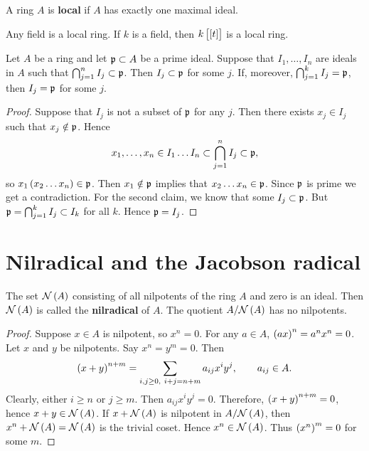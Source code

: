 \begin{definition}
A ring $ A $ is \textbf{local} if $ A $ has exactly one maximal ideal.
\end{definition}

\begin{example*}
Any field is a local ring. If $ k $ is a field, then $ k\sbr{\sbr{t}} $ is a local ring.
\end{example*}

\begin{lemma}
\label{lem:4.12}
Let $ A $ be a ring and let $ \mathfrak{p} \subset A $ be a prime ideal. Suppose that $ I_1, \dots, I_n $ are ideals in $ A $ such that $ \bigcap_{j = 1}^n I_j \subset \mathfrak{p} $. Then $ I_j \subset \mathfrak{p} $ for some $ j $. If, moreover, $ \bigcap_{j = 1}^k I_j = \mathfrak{p} $, then $ I_j = \mathfrak{p} $ for some $ j $.
\end{lemma}

\begin{proof}
Suppose that $ I_j $ is not a subset of $ \mathfrak{p} $ for any $ j $. Then there exists $ x_j \in I_j $ such that $ x_j \notin \mathfrak{p} $. Hence
$$ x_1, \dots, x_n \in I_1 \dots I_n \subset \bigcap_{j = 1}^n I_j \subset \mathfrak{p}, $$
so $ x_1\br{x_2 \dots x_n} \in \ppp $. Then $ x_1 \notin \mathfrak{p} $ implies that $ x_2 \dots x_n \in \mathfrak{p} $. Since $ \mathfrak{p} $ is prime we get a contradiction. For the second claim, we know that some $ I_j \subset \mathfrak{p} $. But $ \mathfrak{p} = \bigcap_{j = 1}^k I_j \subset I_k $ for all $ k $. Hence $ \mathfrak{p} = I_j $.
\end{proof}

\section{Nilradical and the Jacobson radical}


\begin{proposition}
The set $ \NNN\br{A} $ consisting of all nilpotents of the ring $ A $ and zero is an ideal. Then $ \NNN\br{A} $ is called the \textbf{nilradical} of $ A $. The quotient $ A / \NNN\br{A} $ has no nilpotents.
\end{proposition}

\begin{proof}
Suppose $ x \in A $ is nilpotent, so $ x^n = 0 $. For any $ a \in A $, $ \br{ax}^n = a^nx^n = 0 $. Let $ x $ and $ y $ be nilpotents. Say $ x^n = y^m = 0 $. Then
$$ \br{x + y}^{n + m} = \sum_{i, j \ge 0, \ i + j = n + m} a_{ij}x^iy^j, \qquad a_{ij} \in A. $$
Clearly, either $ i \ge n $ or $ j \ge m $. Then $ a_{ij}x^iy^j = 0 $. Therefore, $ \br{x + y}^{n + m} = 0 $, hence $ x + y \in \NNN\br{A} $. If $ x + \NNN\br{A} $ is nilpotent in $ A / \NNN\br{A} $, then $ x^n + \NNN\br{A} = \NNN\br{A} $ is the trivial coset. Hence $ x^n \in \NNN\br{A} $. Thus $ \br{x^n}^m = 0 $ for some $ m $.
\end{proof}

